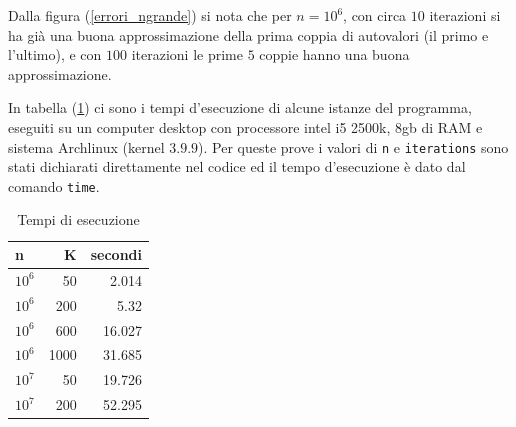 \documentclass[11pt]{article}
\numberwithin{equation}{subsection}
\begin{document}
Dalla figura (\ref{errori_ngrande}) si nota che per $n=10^6$, con circa $10$ iterazioni si ha già una buona approssimazione della prima coppia di autovalori (il primo e l'ultimo), e con $100$ iterazioni le prime $5$ coppie hanno una buona approssimazione.

In tabella (\ref{tempi}) ci sono i tempi d'esecuzione di alcune istanze del programma, eseguiti su un computer desktop con processore intel i5 2500k, 8gb di RAM e sistema Archlinux (kernel $3.9.9$). Per queste prove i valori di \verb~n~ e \verb~iterations~ sono stati dichiarati direttamente nel codice ed il tempo d'esecuzione è dato dal comando \verb~time~.

\begin{table}[htb]
\caption{\label{tempi}Tempi di esecuzione}
\centering
\begin{tabular}{lrr}
n & K & secondi\\
\hline
$10^{6}$ & 50 & 2.014\\
$10^{6}$ & 200 & 5.32\\
$10^{6}$ & 600 & 16.027\\
$10^{6}$ & 1000 & 31.685\\
$10^{7}$ & 50 & 19.726\\
$10^{7}$ & 200 & 52.295\\
\end{tabular}
\end{table}
\end{document}
